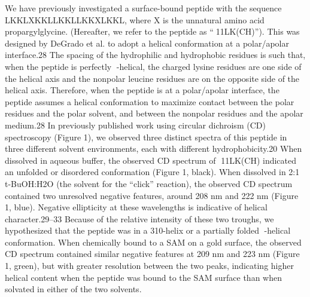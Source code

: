 We have previously investigated a surface-bound peptide with the sequence LKKLXKKLLKKLLKKXLKKL, where X is the unnatural amino acid propargylglycine. (Hereafter, we refer to the peptide as “11LK(CH)”). This was designed by DeGrado et al. to adopt a helical conformation at a polar/apolar interface.28 The spacing of the hydrophilic and hydrophobic residues is such that, when the peptide is perfectly -helical, the charged lysine residues are one side of the helical axis and the nonpolar leucine residues are on the opposite side of the helical axis. Therefore, when the peptide is at a polar/apolar interface, the peptide assumes a helical conformation to maximize contact between the polar residues and the polar solvent, and between the nonpolar residues and the apolar medium.28 In previously published work using circular dichroism (CD) spectroscopy (Figure 1), we observed three distinct spectra of this peptide in three different solvent environments, each with different hydrophobicity.20 When dissolved in aqueous buffer, the observed CD spectrum of 11LK(CH) indicated an unfolded or disordered conformation (Figure 1, black). When dissolved in 2:1 t-BuOH:H2O (the solvent for the “click” reaction), the observed CD spectrum contained two unresolved negative features, around 208 nm and 222 nm (Figure 1, blue). Negative ellipticity at these wavelengths is indicative of helical character.29–33 Because of the relative intensity of these two troughs, we hypothesized that the peptide was in a 310-helix or a partially folded -helical conformation. When chemically bound to a SAM on a gold surface, the observed CD spectrum contained similar negative features at 209 nm and 223 nm (Figure 1, green), but with greater resolution between the two peaks, indicating higher helical content when the peptide was bound to the SAM surface than when solvated in either of the two solvents.
